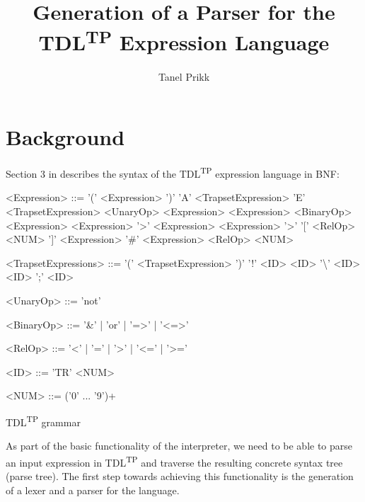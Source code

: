 \documentclass[12pt,oneside,a4paper,notitlepage]{report}
\title{
	Generation of a Parser for the TDL\textsuperscript{TP} Expression Language
}
\author{Tanel Prikk}
\newcommand{\texttilde}{\raisebox{0.5ex}{\texttildelow}}
\begin{document}
	\maketitle

	\section*{Background}
	\par Section 3 in \cite{tdlarticle} describes the syntax of the TDL\textsuperscript{TP} expression language in BNF:

	\begin{GrammarWrapper}
		\begin{grammar}
		<Expression>	::=	'(' <Expression> ')'
		\alt 				'A' <TrapsetExpression>
		\alt 				'E' <TrapsetExpression>
		\alt 				<UnaryOp> <Expression>
		\alt 				<Expression> <BinaryOp> <Expression>
		\alt 				<Expression> '\texttilde\textgreater' <Expression>
		\alt 				<Expression> '\texttilde\textgreater' '[' <RelOp> <NUM> ']' <Expression>
		\alt 				'\#' <Expression> <RelOp> <NUM>
		
		<TrapsetExpressions>	::=	'(' <TrapsetExpression> ')'
		\alt						'!' <ID>
		\alt 						<ID> '\textbackslash' <ID>
		\alt						<ID> ';' <ID>
		
		<UnaryOp>	::= 'not'
		
		<BinaryOp>	::= '\&' | 'or' | '=\textgreater' | '\textless=\textgreater'
		
		<RelOp> 	::= '\textless' | '=' | '\textgreater' | '\textless=' | '\textgreater='
		
		<ID> 		::= 'TR' <NUM>
		
		<NUM> 		::= ('0' ... '9')+
		\end{grammar}
		\caption{TDL\textsuperscript{TP} grammar}\label{bnf:original}
	\end{GrammarWrapper}

	\newpage

	As part of the basic functionality of the interpreter, we need to be able to parse an input expression in TDL\textsuperscript{TP} and traverse the resulting concrete syntax tree (parse tree). The first step towards achieving this functionality is the generation of a lexer and a parser for the language. 
\end{document}
